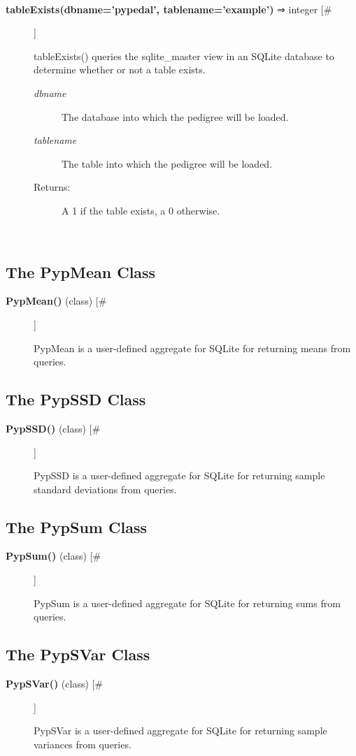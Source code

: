 \documentclass[10pt]{article}
\begin{document}
\begin{description}
\begin{description}
\end{description}
\\ 

\item[\textbf{tableExists(dbname='pypedal', tablename='example')}
 ⇒ integer [\#]]

 tableExists() queries the sqlite\_master view in an SQLite database to determine whether or not a table exists.
\begin{description}
\item[\emph{dbname}
] The database into which the pedigree will be loaded.
\item[\emph{tablename}
] The table into which the pedigree will be loaded.
\item[Returns:] A 1 if the table exists, a 0 otherwise.

\end{description}
\\ 


\end{description}
\subsection*{The PypMean Class}
\begin{description}
\item[\textbf{PypMean()}
 (class) [\#]]

 PypMean is a user-defined aggregate for SQLite for returning means from queries.


\end{description}
\subsection*{The PypSSD Class}
\begin{description}
\item[\textbf{PypSSD()}
 (class) [\#]]

 PypSSD is a user-defined aggregate for SQLite for returning sample standard deviations from queries.


\end{description}
\subsection*{The PypSum Class}
\begin{description}
\item[\textbf{PypSum()}
 (class) [\#]]

 PypSum is a user-defined aggregate for SQLite for returning sums from queries.


\end{description}
\subsection*{The PypSVar Class}
\begin{description}
\item[\textbf{PypSVar()}
 (class) [\#]]

 PypSVar is a user-defined aggregate for SQLite for returning sample variances from queries.


\end{description}
\end{document}
